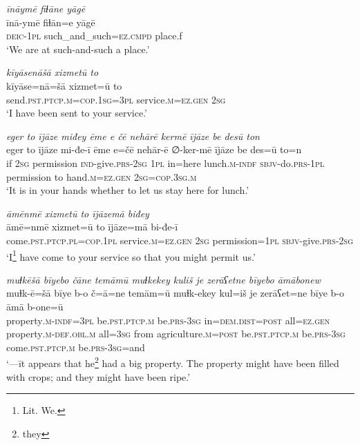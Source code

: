 \ea \label{PM.12}
\textit{īnāymē fiɫāne yāgē} \\ 
\gll īnā-ymē fiɫān=e yāgē \\ 
 \textsc{deic-1pl} such\_and\_such\textsc{=ez}\textsc{.cmpd} place.f \\ 
\glt `We are at such-and-such a place.'
\z 
 
\ea \label{PM.13}
\textit{kīyāsenāšā xizmetū to} \\ 
\gll kīyāse=nā=šā xizmet=ū to \\ 
 send\textsc{.pst}\textsc{.ptcp}\textsc{.m}\textsc{=cop}\textsc{.\textsc{1sg}}\textsc{=3pl} service\textsc{.m}\textsc{\textsc{=ez.gen}} \textsc{2sg} \\ 
\glt `I have been sent to your service.'
\z 
 
\ea \label{PM.14}
\textit{eger to ījāze miđey ēme e čē nehārē kermē ījāze be desū ton} \\ 
\gll eger to ījāze mi-đe-ī ēme e=čē nehār-ē ∅-ker-mē ījāze be des=ū to=n \\ 
 if \textsc{2sg} permission \textsc{ind-}give\textsc{.prs}-\textsc{2sg} \textsc{1pl} in=here lunch\textsc{.m}\textsc{-indf} \textsc{sbjv-}do\textsc{.prs}\textsc{-1pl} permission to hand\textsc{.m}\textsc{\textsc{=ez.gen}} \textsc{2sg}\textsc{=cop}\textsc{.3sg}\textsc{.m} \\ 
\glt `It is in your hands whether to let us stay here for lunch.'
\z 
 
\ea \label{PM.15}
\textit{āmēnmē xizmetū to ījāzemā biđey} \\ 
\gll āmē=nmē xizmet=ū to ījāze=mā bi-đe-ī \\ 
 come\textsc{.pst}\textsc{.ptcp}\textsc{.pl}\textsc{=cop}\textsc{.1pl} service\textsc{.m}\textsc{\textsc{=ez.gen}} \textsc{2sg} permission\textsc{=1pl} \textsc{sbjv-}give\textsc{.prs}-\textsc{2sg} \\ 
\glt `I\footnote{Lit. We.} have come to your service so that you might permit us.'
\z 
 
\ea \label{PM.18}
\textit{muɫkēšā bīyebo čāne temāmū muɫkekey kuliš je zerāʕetne bīyebo āmābonew} \\ 
\gll muɫk-ē=šā bīye b-o č=ā=ne temām=ū muɫk-ekey kul=iš je zerāʕet=ne bīye b-o āmā b-one=ū \\ 
 property\textsc{.m}\textsc{-indf}\textsc{=3pl} be\textsc{.pst}\textsc{.ptcp}\textsc{.m} be\textsc{.prs}\textsc{-3sg} in=\textsc{dem.dist}\textsc{=\textsc{post}} all\textsc{\textsc{=ez.gen}} property\textsc{.m}\textsc{-def}\textsc{.obl}\textsc{.m} all\textsc{=3sg} from agriculture\textsc{.m}\textsc{=\textsc{post}} be\textsc{.pst}\textsc{.ptcp}\textsc{.m} be\textsc{.prs}\textsc{-3sg} come\textsc{.pst}\textsc{.ptcp}\textsc{.m} be\textsc{.prs}\textsc{-3sg}=and \\ 
\glt `—īt appears that he\footnote{they} had a big property. The property might have been filled with crops; and they might have been ripe.'
\z 
 

